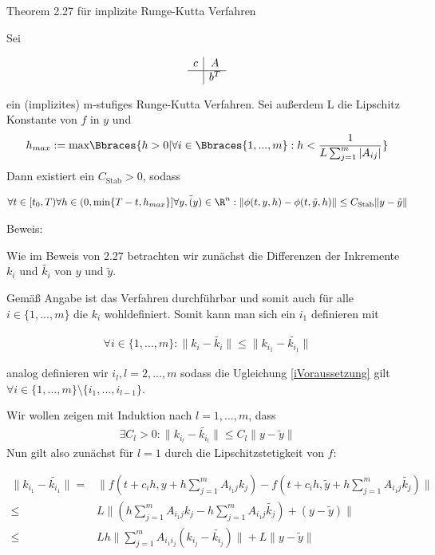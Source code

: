 \begin{solution}
Theorem 2.27 für implizite Runge-Kutta Verfahren

Sei

\begin{align*}
  \begin{array}{c|c}
    c & A \\
    \hline
    & b^{T}
  \end{array}
\end{align*}

ein (implizites) m-stufiges Runge-Kutta Verfahren. Sei außerdem L die Lipschitz Konstante von $f$ in $y$ und
\begin{align*}
  h_{max} := \text{max}\Bbraces{h>0|\forall i \in \Bbraces{1,...,m}:h<\frac{1}{L\sum_{j=1}^{m}|A_{ij}|}}
\end{align*}
Dann existiert ein $C_{\text{Stab}} > 0$, sodass

\begin{align*}
  \forall t \in [t_{0},T) \forall h \in (0,\text{min}\{T-t,h_{max}\}] \forall y, \tilde(y) \in \R^{n} : \|\phi(t,y,h) - \phi(t,\tilde{y},h)\| \leq C_{\text{Stab}} \|y-\tilde{y}\|
\end{align*}

Beweis:

Wie im Beweis von 2.27 betrachten wir zunächst die Differenzen der Inkremente $k_{i}$ und $\tilde{k_{i}}$ von $y$ und $\tilde{y}$.

Gemäß Angabe ist das Verfahren durchführbar und somit auch für alle $i \in \{1,...,m\}$ die $k_{i}$ wohldefiniert.
Somit kann man sich ein $i_{1}$ definieren mit

\begin{align}\label{iVoraussetzung}
  \forall i\in \{1,...,m\}: \|k_{i}-\tilde{k_{i}}\| \leq \|k_{i_{1}}-\tilde{k_{i_{1}}}\|
\end{align}

analog definieren wir $i_{l}, l=2,...,m$ sodass die Ugleichung \eqref{iVoraussetzung} gilt $\forall i\in \{1,...,m\}\setminus \{i_{1},...,i_{l-1}\}$.

Wir wollen zeigen mit Induktion nach $l=1,...,m$, dass
\begin{align}\label{ind}
  \exists C_{l}>0: \|k_{i_{l}}-\tilde{k_{i_{l}}}\| \leq C_{l} \|y-\tilde{y}\|
\end{align}
Nun gilt also zunächst für $l=1$ durch die Lipschitzstetigkeit von $f$:

\begin{align*}
  \|k_{i_{1}}-\tilde{k_{i_{1}}}\| =& \|f(t+c_{i}h,y+h\sum_{j=1}^{m}A_{i_{1}j}k_{j})-f(t+c_{i}h,\tilde{y}+h\sum_{j=1}^{m}A_{i_{1}j}\tilde{k_{j}})\| \\
  \leq& L\|(h\sum_{j=1}^{m}A_{i_{1}j}k_{j}-h\sum_{j=1}^{m}A_{i_{1}j}\tilde{k_{j}}) + (y-\tilde{y})\| \\
  \leq& Lh \|\sum_{j=1}^{m}A_{i_{1}i_{j}}(k_{i_{j}}-\tilde{k_{i_{j}}})\| + L\|y-\tilde{y}\|
\end{align*}


\end{solution}
